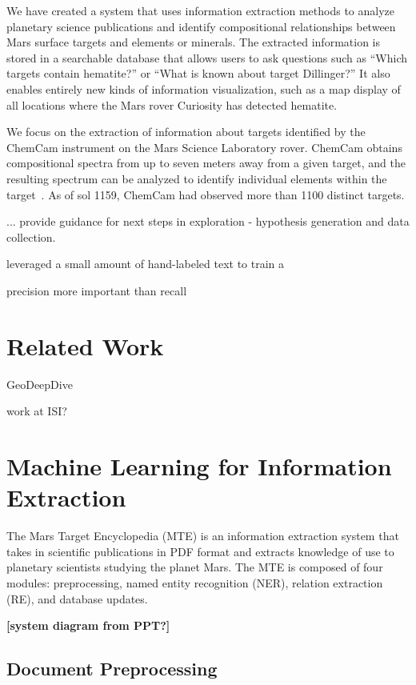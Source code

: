 \documentclass[letterpaper]{article} %
\begin{document}
We have created a system that uses information extraction methods to
analyze planetary science publications and identify compositional
relationships between Mars surface targets and elements or minerals.
The extracted information is stored in a searchable database that
allows users to ask questions such as ``Which targets contain
hematite?'' or ``What is known about target Dillinger?''  It also
enables entirely new kinds of information visualization, such as a map
display of all locations where the Mars rover Curiosity has detected
hematite. 

We focus on the extraction of information about targets identified by
the ChemCam instrument on the Mars Science Laboratory rover.  ChemCam
obtains compositional spectra from up to seven meters away from a
given target, and the resulting spectrum can be analyzed to identify
individual elements within the target~\cite{maurice:chemcam12}.  As of
sol 1159, ChemCam had observed more than 1100 distinct targets.

... provide guidance for next steps in exploration 
- hypothesis generation and data collection.

leveraged a small amount of hand-labeled text to train a

precision more important than recall

\section{Related Work}

GeoDeepDive

work at ISI?

\section{Machine Learning for Information Extraction}

The Mars Target Encyclopedia (MTE) is an information extraction system
that takes in scientific publications in PDF format and extracts
knowledge of use to planetary scientists studying the planet Mars.
The MTE is composed of four modules: preprocessing, named entity
recognition (NER), relation extraction (RE), and database updates.

{\bf [system diagram from PPT?]}

\subsection{Document Preprocessing}
\end{document}
